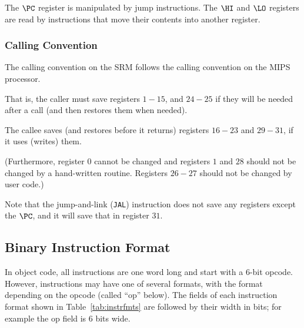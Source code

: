 \documentclass[11pt,letterpaper]{article}
\newcommand{\tabref}[1]{Table~\ref{#1}}  %
\begin{document}
The $\PC$ register is manipulated by jump instructions.
The $\HI$ and $\LO$ registers are read by instructions that move their contents into another register.

\subsubsection{Calling Convention}

The calling convention on the SRM follows the calling convention on
the MIPS processor.

That is, the caller must save registers $1-15$, and $24-25$
if they will be needed after a call (and then restores them when
needed).

The callee saves (and restores before it returns) registers $16-23$
and $29-31$, if it uses (writes) them.

(Furthermore, register $0$ cannot be changed and registers $1$ and
$28$ should not be changed by a hand-written routine.
Registers $26-27$ should not be changed by user code.)

Note that the jump-and-link (\texttt{JAL}) instruction
does not save any registers except the $\PC$,
and it will save that in register $31$.

\subsection{Binary Instruction Format}

In object code,
all instructions are one word long and start with a 6-bit opcode.
However, instructions may have one of several formats, with the format
depending on the opcode (called ``op'' below).
The fields of each instruction format shown in \tabref{tab:instrfmts}
are followed by their width in bits;
for example the op field is 6 bits wide.
\end{document}
